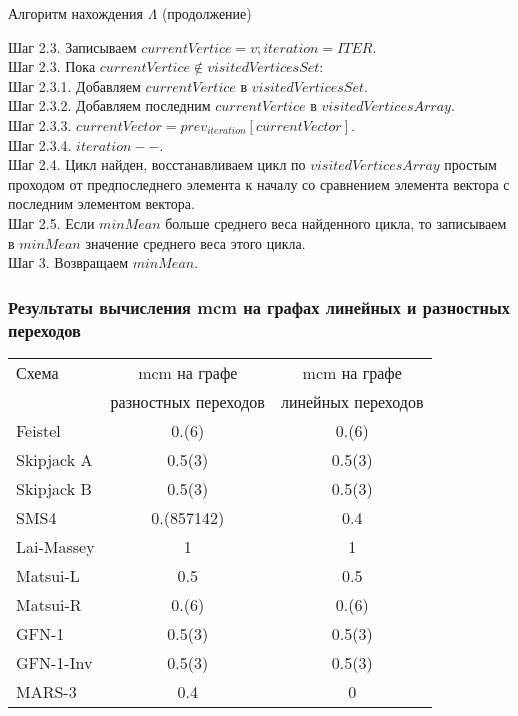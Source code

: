 \documentclass{beamer}
\begin{document}
\begin{algorithm}[H]
\caption{Алгоритм нахождения $\Lambda$ (продолжение)}
Шаг 2.3. Записываем $currentVertice = v; iteration = ITER$.\\
Шаг 2.3. Пока $currentVertice \notin visitedVerticesSet$:\\
Шаг 2.3.1. Добавляем $currentVertice$ в $visitedVerticesSet$.\\
Шаг 2.3.2. Добавляем последним $currentVertice$ в $visitedVerticesArray$.\\
Шаг 2.3.3. $currentVector = prev_{iteration}[currentVector]$.\\
Шаг 2.3.4. $iteration--$.\\
Шаг 2.4. Цикл найден, восстанавливаем цикл по $visitedVerticesArray$ простым проходом от предпоследнего элемента к началу со сравнением элемента вектора с последним элементом вектора.\\
Шаг 2.5. Если $minMean$ больше среднего веса найденного цикла, то записываем в $minMean$ значение среднего веса этого цикла.\\
Шаг 3. Возвращаем $minMean$.\\ 
\end{algorithm}
\begin{frame}
    \frametitle{Результаты вычисления mcm на графах линейных и разностных переходов}

\begin{tabular}{ l | c | c }
  \hline			
  Схема & mcm на графе & mcm на графе \\
   & разностных переходов & линейных переходов \\
\hline
  Feistel & 0.(6) & 0.(6) \\
  Skipjack A & 0.5(3) & 0.5(3) \\
  Skipjack B & 0.5(3) & 0.5(3) \\
  SMS4 & 0.(857142) & 0.4 \\
  Lai-Massey & 1& 1 \\
  Matsui-L & 0.5 & 0.5 \\
  Matsui-R & 0.(6) & 0.(6) \\
  GFN-1 & 0.5(3) & 0.5(3) \\
  GFN-1-Inv & 0.5(3) & 0.5(3)  \\
  MARS-3 & 0.4 & 0 \\
  \hline  
\end{tabular}

  \end{frame}
\end{document}
